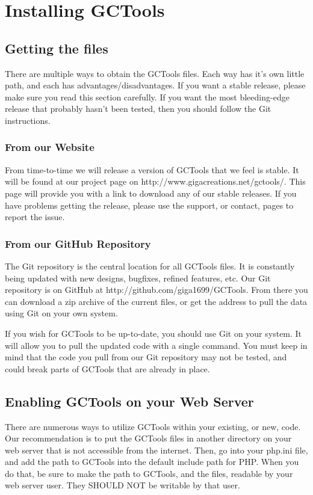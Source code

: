 \documentclass{article}
\begin{document}
\newpage

\section{Installing GCTools}
\subsection{Getting the files}
There are multiple ways to obtain the GCTools files. Each way has it's own little path, and each has advantages/disadvantages. If you want a stable release, please make sure you read this section carefully. If you want the most bleeding-edge release that probably hasn't been tested, then you should follow the Git instructions.

\subsubsection{From our Website}
From time-to-time we will release a version of GCTools that we feel is stable. It will be found at our project page on http://www.gigacreations.net/gctools/. This page will provide you with a link to download any of our stable releases. If you have problems getting the release, please use the support, or contact, pages to report the issue.

\subsubsection{From our GitHub Repository}
The Git repository is the central location for all GCTools files. It is constantly being updated with new designs, bugfixes, refined features, etc. Our Git repository is on GitHub at http://github.com/giga1699/GCTools. From there you can download a zip archive of the current files, or get the address to pull the data using Git on your own system.

If you wish for GCTools to be up-to-date, you should use Git on your system. It will allow you to pull the updated code with a single command. You must keep in mind that the code you pull from our Git repository may not be tested, and could break parts of GCTools that are already in place.

\subsection{Enabling GCTools on your Web Server}
There are numerous ways to utilize GCTools within your existing, or new, code. Our recommendation is to put the GCTools files in another directory on your web server that is not accessible from the internet. Then, go into your php.ini file, and add the path to GCTools into the default include path for PHP. When you do that, be sure to make the path to GCTools, and the files, readable by your web server user. They SHOULD NOT be writable by that user.
\end{document}
